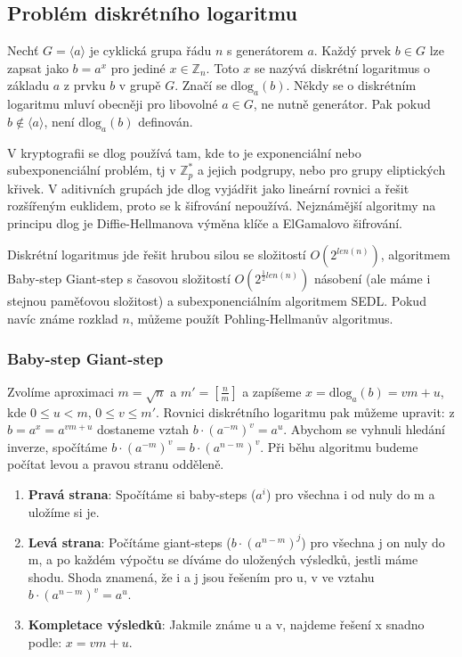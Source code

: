 \documentclass[10pt,a4paper]{article}
\begin{document}
\subsection{Problém diskrétního logaritmu}
Nechť $G = \langle a \rangle$ je cyklická grupa řádu $n$ s generátorem $a$.
Každý prvek $b \in G$ lze zapsat jako $b = a^x$ pro jediné $x \in \mathbb{Z}_n$.
Toto $x$ se nazývá diskrétní logaritmus o základu $a$ z prvku $b$ v grupě $G$.
Značí se $\text{dlog}_a (b)$. Někdy se o diskrétním logaritmu mluví obecněji pro
libovolné $a \in G$, ne nutně generátor. Pak pokud $b \notin \langle a \rangle$,
není $\text{dlog}_a (b)$ definován.

V kryptografii se dlog používá tam, kde to je exponenciální nebo
subexponenciální problém, tj v $\mathbb{Z}_p^*$ a jejich podgrupy, nebo pro
grupy eliptických křivek. V aditivních grupách jde dlog vyjádřit jako lineární
rovnici a řešit rozšířeným euklidem, proto se k šifrování nepoužívá. Nejznámější
algoritmy na principu dlog je Diffie-Hellmanova výměna klíče a ElGamalovo
šifrování.

Diskrétní logaritmus jde řešit hrubou silou se složitostí $O(2^{len(n)})$,
algoritmem Baby-step Giant-step s časovou složitostí $O(2^{\frac{1}{2}len(n)})$
násobení (ale máme i stejnou paměťovou složitost) a subexponenciálním algoritmem
SEDL. Pokud navíc známe rozklad $n$, můžeme použít Pohling-Hellmanův algoritmus.

\subsubsection{Baby-step Giant-step}
Zvolíme aproximaci $m = \sqrt{n}$ a $m' = [ \frac{n}{m}]$ a zapíšeme $x =
\text{dlog}_a (b) = vm + u$, kde $0 \leq u < m$, $0 \leq v \leq m'$. Rovnici
diskrétního logaritmu pak můžeme upravit: z $b = a^x = a^{vm + u}$ dostaneme
vztah $b\cdot (a^{-m})^v = a^u$. Abychom se vyhnuli hledání inverze, spočítáme
$b\cdot (a^{-m})^v = b\cdot (a^{n-m})^v$. Při běhu algoritmu budeme počítat
levou a pravou stranu odděleně. 

\begin{enumerate}
\item \textbf{Pravá strana}: Spočítáme si baby-steps ($a^i$) pro všechna i od
nuly do m a uložíme si je.
\item\textbf{Levá strana}: Počítáme giant-steps ($b\cdot (a^{n-m})^j$) pro
všechna j on nuly do m, a po každém výpočtu se díváme do uložených výsledků,
jestli máme shodu. Shoda znamená, že i a j jsou řešením pro u, v ve vztahu
$b\cdot (a^{n-m})^v = a^u$.
\item \textbf{Kompletace výsledků}: Jakmile známe u a v, najdeme řešení x snadno
podle: $x = vm + u$.
\end{enumerate}
\end{document}

